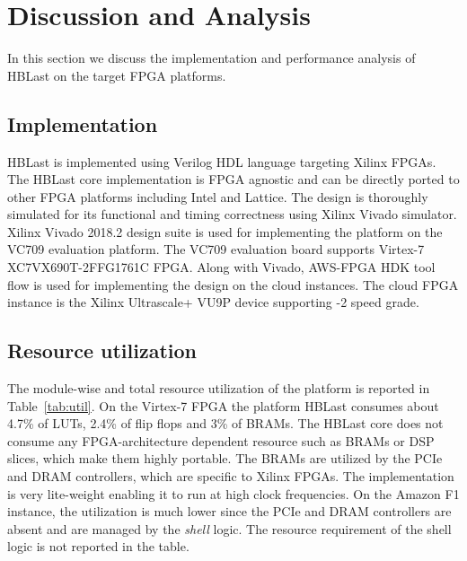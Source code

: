 \section{Discussion and Analysis}
\label{sec:discussion}
In this section we discuss the implementation and performance analysis of HBLast on the target FPGA platforms.

\subsection{Implementation}
HBLast is implemented using Verilog HDL language targeting Xilinx FPGAs.
The HBLast core implementation is FPGA agnostic and can be directly ported to other FPGA platforms including Intel and Lattice.
The design is thoroughly simulated for its functional and timing correctness using Xilinx Vivado simulator.
Xilinx Vivado 2018.2 design suite is used for implementing the platform on the VC709 evaluation platform.
The VC709 evaluation board supports Virtex-7 XC7VX690T-2FFG1761C FPGA. 
Along with Vivado, AWS-FPGA HDK tool flow is used for implementing the design on the cloud instances.
The cloud FPGA instance is the Xilinx Ultrascale+ VU9P device supporting -2 speed grade.
\subsection{Resource utilization}
The module-wise and total resource utilization of the platform is reported in Table~\ref{tab:util}. 
On the Virtex-7 FPGA the platform HBLast consumes about 4.7\% of LUTs, 2.4\% of flip flops and 3\% of BRAMs.
The HBLast core does not consume any FPGA-architecture dependent resource such as BRAMs or DSP slices, which make them highly portable.
The BRAMs are utilized by the PCIe and DRAM controllers, which are specific to Xilinx FPGAs.
The implementation is very lite-weight enabling it to run at high clock frequencies.
On the Amazon F1 instance, the utilization is much lower since the PCIe and DRAM controllers are absent and are managed by the \emph{shell} logic.
The resource requirement of the shell logic is not reported in the table. 

